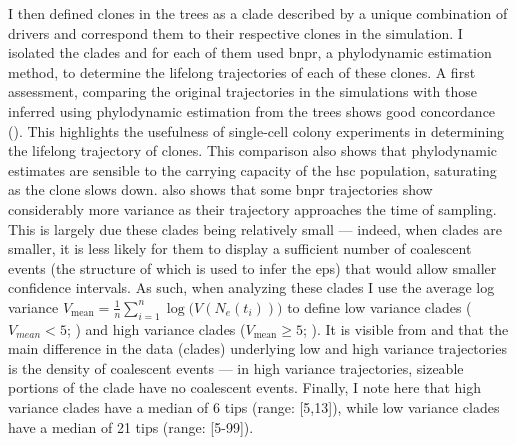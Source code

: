 I then defined clones in the trees as a clade described by a unique combination of drivers and correspond them to their respective clones in the simulation. I isolated the clades and for each of them used \ac{bnpr}, a phylodynamic estimation method, to determine the lifelong trajectories of each of these clones. A first assessment, comparing the original trajectories in the simulations with those inferred using phylodynamic estimation from the trees shows good concordance (). This highlights the usefulness of single-cell colony experiments in determining the lifelong trajectory of clones. This comparison also shows that phylodynamic estimates are sensible to the carrying capacity of the \ac{hsc} population, saturating as the clone slows down.  also shows that some \ac{bnpr} trajectories show considerably more variance as their trajectory approaches the time of sampling. This is largely due these clades being relatively small --- indeed, when clades are smaller, it is less likely for them to display a sufficient number of coalescent events (the structure of which is used to infer the \ac{eps}) that would allow smaller confidence intervals. As such, when analyzing these clades I use the average log variance $V_{\mathrm{mean}} = \frac{1}{n}\sum_{i=1}^{n}{\log(V(N_e(t_i))})$ to define low variance clades ($V_{mean} < 5$; ) and high variance clades ($V_{\mathrm{mean}} \geq 5$; ). It is visible from  and  that the main difference in the data (clades) underlying low and high variance trajectories is the density of coalescent events --- in high variance trajectories, sizeable portions of the clade have no coalescent events. Finally, I note here that high variance clades have a median of 6 tips (range: [5,13]), while low variance clades have a median of 21 tips (range: [5-99]). 

\begin{figure}[!ht]
	\label{fig:wf-vs-bnpr-traj}
\end{figure}

\begin{figure}[!hb]
	\label{fig:low-variance-examples}
\end{figure}

